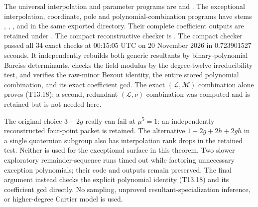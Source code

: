 \begin{remark}
\label{rem:uniform-thirteen-verification-scope-candidate}
The universal interpolation and parameter programs are
 and
.
The exceptional interpolation, coordinate, pole and polynomial-combination
programs have stems ,
,
, and
 in the same exported
directory. Their complete coefficient outputs are retained under
.
The compact reconstructive checker is
.
The compact checker passed all 34 exact checks at 00:15:05 UTC on
20 November 2026 in 0.723901527 seconds. It independently rebuilds
both generic resultants by binary-polynomial Bareiss determinants,
checks the field modulus by the degree-twelve irreducibility test,
and verifies the raw-minor Bezout identity, the entire stored
polynomial combination, and its exact coefficient gcd.
The exact $(\mathcal L,\mathcal M)$ combination alone proves (T13.18);
a second, redundant $(\mathcal L,\nu)$ combination was computed
and is retained but is not needed here.

The original choice $3+2g$ really can fail at $\mu^5=1$:
an independently reconstructed four-point packet is retained.
The alternative $1+2g+2h+2gh$ in a single quaternion subgroup also
has interpolation rank drops in the retained test. Neither is used
for the exceptional surface in this theorem. Two slower exploratory
remainder-sequence runs timed out while factoring unnecessary
exception polynomials; their code and outputs remain preserved.
The final argument instead checks the explicit polynomial identity
(T13.18) and its coefficient gcd directly. No sampling, unproved
resultant-specialization inference, or higher-degree Cartier model
is used.
\end{remark}
